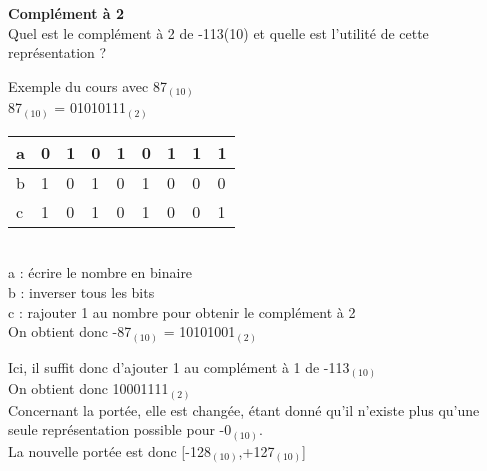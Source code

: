 \begin{Exercice}[15 minutes] \textbf{Complément à 2}\\
    Quel est le complément à 2 de -113(10) et quelle est l'utilité de cette représentation ? \\

    \begin{conseil}
    
    Exemple du cours avec 87$_{(10)}$ \\
    
    87$_{(10)}$ = 01010111$_{(2)}$ \\
    
         \begin{tabular}{| p{1cm} | p{1cm} | p{1cm} | p{1cm} | p{1cm} | p{1cm} | p{1cm} | p{1cm} | p{1cm} |} 
            \hline
            a & 0 & 1 & 0 & 1 & 0 & 1 & 1 & 1 \\ [0.5ex] 
            \hline
            b & 1 & 0 & 1 & 0 & 1 & 0 & 0 & 0 \\ [0.5ex]
            \hline
            c & 1 & 0 & 1 & 0 & 1 & 0 & 0 & 1 \\ [0.5ex]
            \hline
        \end{tabular} \\
        
        a : écrire le nombre en binaire \\
        
        b : inverser tous les bits \\
        
        c : rajouter 1 au nombre pour obtenir le complément à 2 \\
        
        On obtient donc -87$_{(10)}$ = 10101001$_{(2)}$ \\
    \end{conseil}
    
    \begin{solution}
    	Ici, il suffit donc d'ajouter 1 au complément à 1 de -113$_{(10)}$ \\
    	
    	On obtient donc 10001111$_{(2)}$ \\
    	
    	Concernant la portée, elle est changée, étant donné qu'il n'existe plus qu'une seule représentation possible pour -0$_{(10)}$. \\
    	
    	La nouvelle portée est donc [-128$_{(10)}$,+127$_{(10)}$]
        
    \end{solution}
\end{Exercice}

